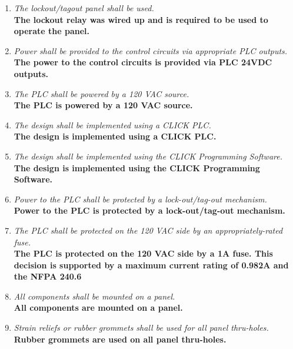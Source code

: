\begin{enumerate}
  \item \emph{ The lockout/tagout panel shall be used.}\\
    \textbf{The lockout relay was wired up and is required to be used
    to operate the panel.}

  \item \emph{ Power shall be provided to the control circuits via
    appropriate PLC outputs.}\\
    \textbf{The power to the control circuits is provided via PLC
    24VDC outputs.}

  \item \emph{ The PLC shall be powered by a 120 VAC source.}\\
    \textbf{The PLC is powered by a 120 VAC source.}

  \item \emph{ The design shall be implemented using a CLICK PLC.}\\
    \textbf{The design is implemented using a CLICK PLC.}

  \item \emph{ The design shall be implemented using the CLICK
    Programming Software.}\\
    \textbf{The design is implemented using the CLICK Programming Software.}

  \item \emph{ Power to the PLC shall be protected by a
    lock-out/tag-out mechanism.}\\
    \textbf{Power to the PLC is protected by a lock-out/tag-out mechanism.}

  \item \emph{ The PLC shall be protected on the 120 VAC side by an
    appropriately-rated fuse.}\\
    \textbf{
      The PLC is protected on the 120 VAC side by a 1A fuse. This
      decision is supported by
      a maximum current rating of 0.982A and the NFPA 240.6
    }

  \item \emph{ All components shall be mounted on a panel.}\\
    \textbf{All components are mounted on a panel.}

  \item \emph{ Strain reliefs or rubber grommets shall be used for
    all panel thru-holes.}\\
    \textbf{Rubber grommets are used on all panel thru-holes.}


\end{enumerate}
